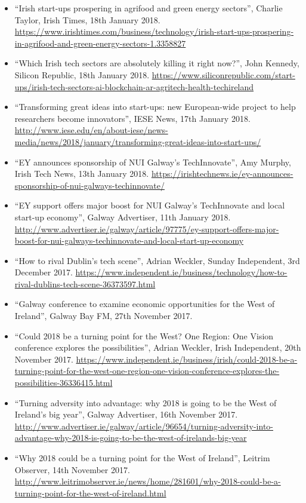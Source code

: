\documentclass[10pt,a4paper]{res} %
\begin{document}
\begin{resume}
{\begin{itemize}
\item ``Irish start-ups prospering in agrifood and green energy sectors'', Charlie Taylor, Irish Times, 18th January 2018. \url{https://www.irishtimes.com/business/technology/irish-start-ups-prospering-in-agrifood-and-green-energy-sectors-1.3358827}
\item ``Which Irish tech sectors are absolutely killing it right now?'', John Kennedy, Silicon Republic, 18th January 2018. \url{https://www.siliconrepublic.com/start-ups/irish-tech-sectors-ai-blockchain-ar-agritech-health-techireland}
\item ``Transforming great ideas into start-ups: new European-wide project to help researchers become innovators'', IESE News, 17th January 2018. \url{http://www.iese.edu/en/about-iese/news-media/news/2018/january/transforming-great-ideas-into-start-ups/}
\item ``EY announces sponsorship of NUI Galway's TechInnovate'', Amy Murphy, Irish Tech News, 13th January 2018. \url{https://irishtechnews.ie/ey-announces-sponsorship-of-nui-galways-techinnovate/}
\item ``EY support offers major boost for NUI Galway's TechInnovate and local start-up economy'', Galway Advertiser, 11th January 2018. \url{http://www.advertiser.ie/galway/article/97775/ey-support-offers-major-boost-for-nui-galways-techinnovate-and-local-start-up-economy}
\item ``How to rival Dublin's tech scene'', Adrian Weckler, Sunday Independent, 3rd December 2017. \url{https://www.independent.ie/business/technology/how-to-rival-dublins-tech-scene-36373597.html}
\item ``Galway conference to examine economic opportunities for the West of Ireland'', Galway Bay FM, 27th November 2017.
\item ``Could 2018 be a turning point for the West? One Region: One Vision conference explores the possibilities'', Adrian Weckler, Irish Independent, 20th November 2017. \url{https://www.independent.ie/business/irish/could-2018-be-a-turning-point-for-the-west-one-region-one-vision-conference-explores-the-possibilities-36336415.html}
\item ``Turning adversity into advantage: why 2018 is going to be the West of Ireland's big year'', Galway Advertiser, 16th November 2017. \url{http://www.advertiser.ie/galway/article/96654/turning-adversity-into-advantage-why-2018-is-going-to-be-the-west-of-irelands-big-year}
\item ``Why 2018 could be a turning point for the West of Ireland'', Leitrim Observer, 14th November 2017. \url{http://www.leitrimobserver.ie/news/home/281601/why-2018-could-be-a-turning-point-for-the-west-of-ireland.html}

\end{itemize}}
\end{resume}
\end{document}

